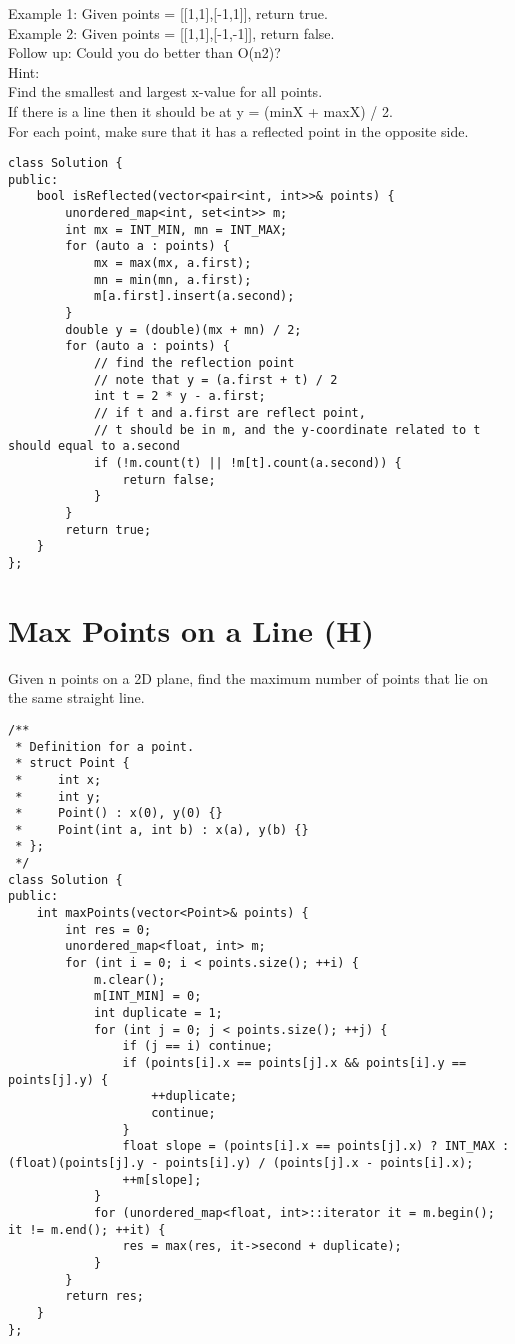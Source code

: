 Example 1:
Given points = [[1,1],[-1,1]], return true.\\

Example 2:
Given points = [[1,1],[-1,-1]], return false.\\

Follow up:
Could you do better than O(n2)?\\

Hint:\\
    Find the smallest and largest x-value for all points.\\
    If there is a line then it should be at y = (minX + maxX) / 2.\\
    For each point, make sure that it has a reflected point in the opposite side.\\

\begin{lstlisting}
class Solution {
public:
    bool isReflected(vector<pair<int, int>>& points) {
        unordered_map<int, set<int>> m;
        int mx = INT_MIN, mn = INT_MAX;
        for (auto a : points) {
            mx = max(mx, a.first);
            mn = min(mn, a.first);
            m[a.first].insert(a.second);
        }
        double y = (double)(mx + mn) / 2;
        for (auto a : points) {
            // find the reflection point
            // note that y = (a.first + t) / 2
            int t = 2 * y - a.first;
            // if t and a.first are reflect point, 
            // t should be in m, and the y-coordinate related to t should equal to a.second
            if (!m.count(t) || !m[t].count(a.second)) {
                return false;
            }
        }
        return true;
    }
};
\end{lstlisting}


\section{Max Points on a Line (H)}
Given n points on a 2D plane, find the maximum number of points that lie on the same straight line.\\

\begin{lstlisting}
/**
 * Definition for a point.
 * struct Point {
 *     int x;
 *     int y;
 *     Point() : x(0), y(0) {}
 *     Point(int a, int b) : x(a), y(b) {}
 * };
 */
class Solution {
public:
    int maxPoints(vector<Point>& points) {
        int res = 0;
        unordered_map<float, int> m;
        for (int i = 0; i < points.size(); ++i) {
            m.clear();
            m[INT_MIN] = 0;
            int duplicate = 1;
            for (int j = 0; j < points.size(); ++j) {
                if (j == i) continue;
                if (points[i].x == points[j].x && points[i].y == points[j].y) {
                    ++duplicate;
                    continue;
                }
                float slope = (points[i].x == points[j].x) ? INT_MAX : (float)(points[j].y - points[i].y) / (points[j].x - points[i].x);
                ++m[slope];
            }
            for (unordered_map<float, int>::iterator it = m.begin(); it != m.end(); ++it) {
                res = max(res, it->second + duplicate);
            }
        }
        return res;
    }
};
\end{lstlisting}


